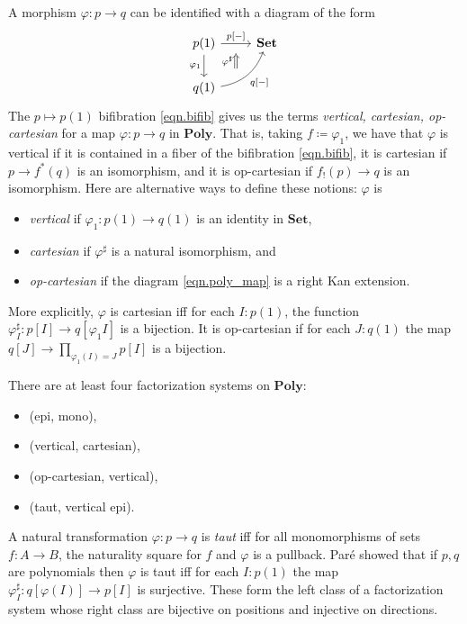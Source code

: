 \documentclass[11pt, one side, article]{memoir}
\theoremstyle{definition}
\theoremstyle{plain}
\newcommand{\Cat}[1]{\mathbf{#1}}%
\newcommand{\smset}{\Cat{Set}}
\newcommand{\poly}{\Cat{Poly}}
\newcommand{\0}{\textsf{0}}
\newcommand{\1}{\tn{\textsf{1}}}
\begin{document}
A morphism $\varphi\colon p\to q$ can be identified with a diagram of the form
\begin{equation}\label{eqn.poly_map}
\begin{tikzcd}
	p(1)\ar[d, "\varphi_1"']\ar[r, "{p[-]}", ""' name=p]&
	\smset\\
	q(1)\ar[ur, bend right, "{q[-]}"', "" name=q]
	\ar[to=p, from=q-|p, Rightarrow, shorten=3pt, "\varphi^\sharp"]
\end{tikzcd}
\end{equation}
The $p\mapsto p(1)$ bifibration \eqref{eqn.bifib} gives us the terms \emph{vertical, cartesian,  op-cartesian} for a map $\varphi\colon p\to q$ in $\poly$. That is, taking $f\coloneqq\varphi_1$, we have that $\varphi$ is vertical if it is contained in a fiber of the bifibration \eqref{eqn.bifib}, it is cartesian if $p\to f^*(q)$ is an isomorphism, and it is op-cartesian if $f_!(p)\to q$ is an isomorphism. Here are alternative ways to define these notions: $\varphi$ is 
\begin{itemize}
	\item \emph{vertical} if $\varphi_1\colon p(1)\to q(1)$ is an identity in $\smset$,
	\item \emph{cartesian} if $\varphi^\sharp$ is a natural isomorphism, and
	\item \emph{op-cartesian} if the diagram \eqref{eqn.poly_map} is a right Kan extension.
\end{itemize}
More explicitly, $\varphi$ is cartesian iff for each $I: p(1)$, the function $\varphi^\sharp_I\colon p[I]\to q[\varphi_1I]$ is a bijection. It is op-cartesian if for each $J: q(1)$ the map $q[J]\to\prod\limits_{\varphi_1(I)=J}p[I]$ is a bijection.

There are at least four factorization systems on $\poly$:
\begin{itemize}
	\item (epi, mono),
	\item (vertical, cartesian),
	\item (op-cartesian, vertical),
	\item (taut, vertical epi).
\end{itemize}
A natural transformation $\varphi\colon p\to q$ is \emph{taut} iff for all monomorphisms of sets $f\colon A\to B$, the naturality square for $f$ and $\varphi$ is a pullback. Par\'{e} showed that if $p,q$ are polynomials then $\varphi$ is taut iff for each $I:p(1)$ the map $\varphi_I^\sharp\colon q[\varphi(I)]\to p[I]$ is surjective. These form the left class of a factorization system whose right class are bijective on positions and injective on directions.
\end{document}
